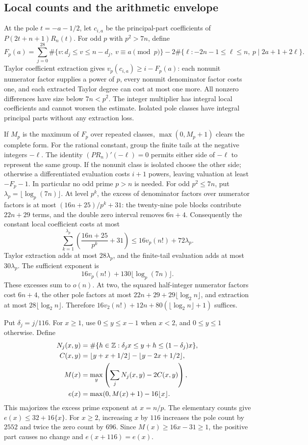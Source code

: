 \subsection{Local counts and the arithmetic envelope}
At the pole $t=-a-1/2$, let $c_{i,a}$ be the principal-part coefficients
of $P(2t+n+1)R_n(t)$. For odd $p$ with $p^2>7n$, define
\[
 F_p(a)=\sum_{j=0}^{28}\#\{v:d_j\leq v\leq n-d_j,\ v\equiv a\pmod p\}
 -2\#\{\ell:-2n-1\leq\ell\leq n,\ p\mid2a+1+2\ell\}.
\]
Taylor coefficient extraction gives $v_p(c_{i,a})\geq i-F_p(a)$:
each nonunit numerator factor supplies a power of $p$, every nonunit
denominator factor costs one, and each extracted Taylor degree can
cost at most one more. All nonzero differences have size below $7n<p^2$.
The integer multiplier has integral local coefficients and cannot
worsen the estimate. Isolated pole classes have integral principal
parts without any extraction loss.

If $M_p$ is the maximum of $F_p$ over repeated classes,
$\max(0,M_p+1)$ clears the complete form. For the rational constant,
group the finite tails at the negative integers $-\ell$. The identity
$(PR_n)'(-\ell)=0$ permits either side of $-\ell$ to represent the
same group. If the nonunit class is isolated choose the other side;
otherwise a differentiated evaluation costs $i+1$ powers, leaving
valuation at least $-F_p-1$. In particular no odd prime $p>n$ is
needed. For odd $p^2\leq7n$, put
$\lambda_p=\lfloor\log_p(7n)\rfloor$. At level $p^k$, the excess
of denominator factors over numerator factors is at most
$(16n+25)/p^k+31$: the twenty-nine pole blocks contribute $22n+29$
terms, and the double zero interval removes $6n+4$.
Consequently the constant local coefficient costs at most
\[
 \sum_{k=1}^{\lambda_p}\left(\frac{16n+25}{p^k}+31\right)
 \leq16v_p(n!)+72\lambda_p.
\]
Taylor extraction adds at most $28\lambda_p$, and the finite-tail
evaluation adds at most $30\lambda_p$. The sufficient exponent is
\[
 16v_p(n!)+130\lfloor\log_p(7n)\rfloor.
\]
These excesses sum to $o(n)$. At two, the squared
half-integer numerator factors cost $6n+4$, the other pole factors
at most $22n+29+29\lfloor\log_2n\rfloor$, and extraction at most
$28\lfloor\log_2n\rfloor$. Therefore
$16v_2(n!)+12n+80(\lfloor\log_2n\rfloor+1)$ suffices.

Put $\delta_j=j/116$. For $x\geq1$, use $0\leq y\leq x-1$
when $x<2$, and $0\leq y\leq1$ otherwise. Define
\begin{align*}
 N_j(x,y)&=\#\{h\in\mathbb Z:\delta_jx\leq y+h\leq(1-\delta_j)x\},\\
 C(x,y)&=\lfloor y+x+1/2\rfloor-\lfloor y-2x+1/2\rfloor,\\
 M(x)&=\max_y\left(\sum_jN_j(x,y)-2C(x,y)\right),\\
 e(x)&=\max(0,M(x)+1)-16\lfloor x\rfloor.
\end{align*}
This majorizes the excess prime exponent at $x=n/p$.
The elementary counts give $e(x)\leq32+16\{x\}$.
For $x\geq2$, increasing $x$ by $116$ increases the pole count by
$2552$ and twice the zero count by $696$. Since $M(x)\geq16x-31\geq1$,
the positive part causes no change and $e(x+116)=e(x)$.

